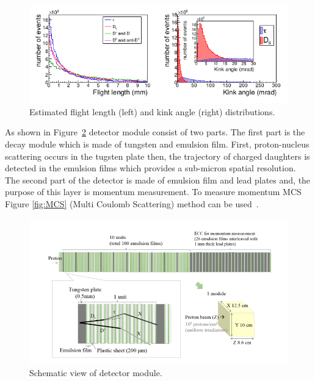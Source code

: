 \documentclass[12pt]{report}
\begin{document}
\begin{figure}[htp]
\centering
\includegraphics[width = \linewidth]{pythiaOut.png}
\caption{Estimated flight length (left) and kink angle (right) distributions.~\cite[p.~5]{aoki_ariga_dmitrievsky_firu_forshaw_fukuda_gornushkin_guler_haiduc_2019}}
\label{fig:result}
\end{figure}


As shown in Figure~\ref{fig:detector} detector module consist of two parts. The first part is the decay module which is made of tungsten and emulsion film. First, proton-nucleus scattering occurs in the tugsten plate then, the trajectory of charged daughters is detected in the emulsion films which provides a sub-micron spatial resolution. The second part of the detector is made of emulsion film and lead plates and, the purpose of this layer is momentum measurement. To measure momentum MCS Figure \ref{fig:MCS} (Multi Coulomb Scattering) method can be used~\cite{Agafonova_2012}.

\begin{figure}[htp]
\centering
\includegraphics[width = \linewidth]{detector.png}
\caption{Schematic view of detector module.~\cite[p.~6]{aoki_ariga_dmitrievsky_firu_forshaw_fukuda_gornushkin_guler_haiduc_2019}}
\label{fig:detector}
\end{figure}
\end{document}
